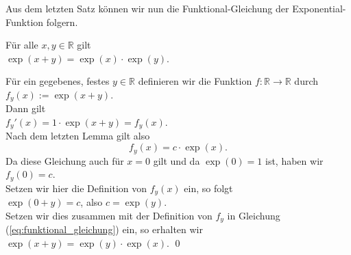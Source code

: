 Aus dem letzten Satz k\"onnen wir nun die Funktional-Gleichung der Exponential-Funktion folgern.
\begin{Satz}
  F\"ur alle $x,y \in \mathbb{R}$ gilt 
  \\[0.2cm]
  \hspace*{1.3cm}
  $\exp(x + y) = \exp(x) \cdot \exp(y)$.  
\end{Satz}

\proof
F\"ur ein gegebenes, festes $y \in \mathbb{R}$ definieren wir die Funktion $f:\mathbb{R} \rightarrow \mathbb{R}$
durch  
\\[0.2cm]
\hspace*{1.3cm}
$f_y(x) := \exp(x + y)$.
\\[0.2cm]
Dann gilt 
\\[0.2cm]
\hspace*{1.3cm}
$f_y'(x) = 1 \cdot \exp(x + y) = f_y(x)$.
\\[0.2cm]
Nach dem letzten Lemma gilt also 
\begin{equation}
  \label{eq:funktional_gleichung}
  f_y(x) = c \cdot \exp(x).  
\end{equation}
Da diese Gleichung auch f\"ur $x=0$ gilt und da $\exp(0) = 1$ ist, haben wir
\\[0.2cm]
\hspace*{1.3cm}
$f_y(0) = c$.
\\[0.2cm]
Setzen wir hier die Definition von $f_y(x)$ ein, so folgt
\\[0.2cm]
\hspace*{1.3cm}
$\exp(0 + y) = c$, \quad also $c = \exp(y)$.
\\[0.2cm]
Setzen wir dies zusammen mit der Definition von $f_y$ in Gleichung (\ref{eq:funktional_gleichung}) ein,
so erhalten wir
\\[0.2cm]
\hspace*{1.3cm}
$\exp(x+y) = \exp(y) \cdot \exp(x)$. \qed

